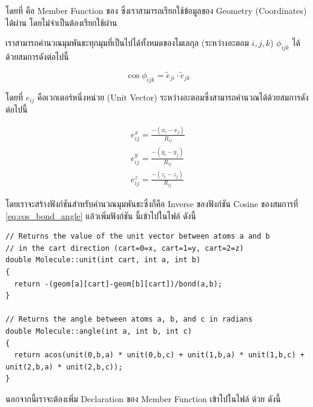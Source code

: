 \vspace{5pt}

\noindent โดยที่  คือ Member Function ของ  ซึ่งเราสามารถเรียกใช้ข้อมูลของ Geometry (Coordinates)
ได้ผ่าน  โดยไม่จำเป็นต้องเรียกใช้ผ่าน 

\noindent {}

เราสามารถคำนวณมุมพันธะทุกมุมที่เป็นไปได้ทั้งหมดของโมเลกุล (ระหว่างอะตอม $i, j, k$) $\phi_{ijk}$ ได้ด้วยสมการดังต่อไปนี้

\begin{equation}
  \label{eq:cos_bond_angle}
  \cos \phi_{ijk} = \tilde{e}_{ji} \cdot \tilde{e}_{jk}
\end{equation}

\noindent โดยที่ $e_{ij}$ คือเวกเตอร์หนึ่งหน่วย (Unit Vector) ระหว่างอะตอมซึ่งสามารถคำนวณได้ด้วยสมการดังต่อไปนี้

\begin{align*}
  e^{x}_{ij}
  = \frac{
    -(x_{i} - x_{j})
  }
  {
    R_{ij}
  } \\
  e^{y}_{ij}
  = \frac{
    -(y_{i} - y_{j})
  }
  {
    R_{ij}
  } \\
  e^{z}_{ij}
  = \frac{
    -(z_{i} - z_{j})
  }
  {
    R_{ij}
  }
\end{align*}

\vspace{5pt}

โดยเราจะสร้างฟังก์ชันสำหรับคำนวณมุมพันธะซึ่งก็คือ Inverse ของฟังก์ชัน Cosine ของสมการที่ \ref{eq:cos_bond_angle} แล้วเพิ่มฟังก์ชัน%
นี้เข้าไปในไฟล์  ดังนี้

\vspace{5pt}

\begin{lstlisting}[style=MyC++]
// Returns the value of the unit vector between atoms a and b
// in the cart direction (cart=0=x, cart=1=y, cart=2=z)
double Molecule::unit(int cart, int a, int b)
{
  return -(geom[a][cart]-geom[b][cart])/bond(a,b);
}

// Returns the angle between atoms a, b, and c in radians
double Molecule::angle(int a, int b, int c)
{
  return acos(unit(0,b,a) * unit(0,b,c) + unit(1,b,a) * unit(1,b,c) + unit(2,b,a) * unit(2,b,c));
}
\end{lstlisting}

\vspace{5pt}

\noindent นอกจากนี้เราจะต้องเพิ่ม Declaration ของ Member Function เข้าไปในไฟล์  ด้วย ดังนี้

